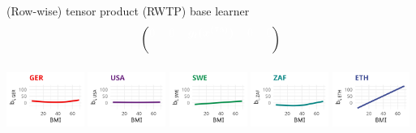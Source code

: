 \documentclass[t,10pt]{beamer}
\begin{document}
\begin{frame}{(Row-wise) tensor product (RWTP) base learner}
$$\begin{blockarray}{ccccc}
\begin{block}{(ccccc)}
      \color{white}0 & \color{white}0 & \color{white}\bm{g_l(x^{(75)})} & \color{white}0 & \color{white}0 \\
      \phantom{x}\\
    \end{block}
  \end{blockarray}
  $$
  \normalsize
  {\includegraphics[width=0.19\textwidth]{figures/bs-tensor/fig-tensor-GER.png}}
  \includegraphics[width=0.19\textwidth]{figures/bs-tensor/fig-tensor-USA.png}
  {\includegraphics[width=0.19\textwidth]{figures/bs-tensor/fig-tensor-SWE.png}}
  {\includegraphics[width=0.19\textwidth]{figures/bs-tensor/fig-tensor-ZAF.png}}
  {\includegraphics[width=0.19\textwidth]{figures/bs-tensor/fig-tensor-ETH.png}}
\end{frame}
\end{document}
